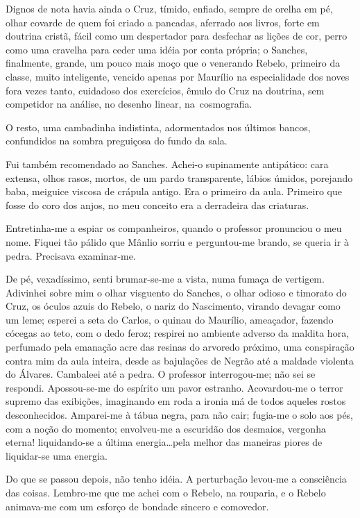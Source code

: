 Dignos de nota havia ainda o Cruz, tímido, enfiado, sempre de orelha em
pé, olhar covarde de quem foi criado a pancadas, aferrado aos livros,
forte em doutrina cristã, fácil como um despertador para desfechar as
lições de cor, perro como uma cravelha para ceder uma idéia por conta
própria; o Sanches, finalmente, grande, um pouco mais moço que o
venerando Rebelo, primeiro da classe, muito inteligente, vencido apenas
por Maurílio na especialidade dos noves fora vezes tanto, cuidadoso dos
exercícios, êmulo do Cruz na doutrina, sem competidor na análise, no
desenho linear, \mbox{na cosmografia.} 

O resto, uma cambadinha indistinta,
adormentados nos últimos bancos, confundidos na sombra preguiçosa do
fundo da sala. 

Fui também recomendado ao Sanches. Achei{}-o supinamente
antipático: cara extensa, olhos rasos, mortos, de um pardo
transparente, lábios úmidos, porejando baba, meiguice viscosa de
crápula antigo. Era o primeiro da aula. Primeiro que fosse do coro dos
anjos, no meu conceito era a derradeira das criaturas. 

Entretinha{}-me a espiar os companheiros, quando o professor pronunciou o meu nome.
Fiquei tão pálido que Mânlio sorriu e perguntou{}-me brando, se queria
ir à pedra. Precisava examinar{}-me. 


De pé, vexadíssimo, senti
brumar{}-se{}-me a vista, numa fumaça de vertigem. Adivinhei sobre mim
o olhar visguento do Sanches, o olhar odioso e timorato do Cruz, os
óculos azuis do Rebelo, o nariz do Nascimento, virando devagar como um leme; 
esperei a seta do Carlos, o
quinau do Maurílio, ameaçador, fazendo cócegas ao teto, com o dedo
feroz; respirei no ambiente adverso da maldita hora, perfumado pela
emanação acre das resinas do arvoredo próximo, uma conspiração contra
mim da aula inteira, desde as bajulações de Negrão até a maldade
violenta do Álvares. Cambaleei até a pedra. O professor
interrogou{}-me; não sei se respondi. Apossou{}-se{}-me do espírito um
pavor estranho. Acovardou{}-me o terror supremo das exibições,
imaginando em roda a ironia má de todos aqueles rostos desconhecidos.
Amparei{}-me à tábua negra, para não cair; fugia{}-me o solo aos pés,
com a noção do momento; envolveu{}-me a escuridão dos desmaios,
vergonha eterna! liquidando{}-se a última energia\ldots pela melhor das
maneiras piores de liquidar{}-se uma energia.

Do que se passou depois,
não tenho idéia. A perturbação levou{}-me a consciência das coisas.
Lembro{}-me que me achei com o Rebelo, na rouparia, e o Rebelo
animava{}-me com um esforço de bondade sincero e comovedor. 

